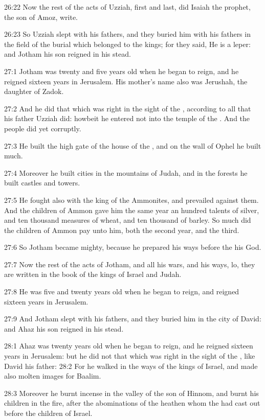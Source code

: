 26:22 Now the rest of the acts of Uzziah, first and last, did Isaiah
the prophet, the son of Amoz, write.

26:23 So Uzziah slept with his fathers, and they buried him with his
fathers in the field of the burial which belonged to the kings; for
they said, He is a leper: and Jotham his son reigned in his stead.

27:1 Jotham was twenty and five years old when he began to reign, and
he reigned sixteen years in Jerusalem. His mother's name also was
Jerushah, the daughter of Zadok.

27:2 And he did that which was right in the sight of the \LORD,
according to all that his father Uzziah did: howbeit he entered not
into the temple of the \LORD. And the people did yet corruptly.

27:3 He built the high gate of the house of the \LORD, and on the wall
of Ophel he built much.

27:4 Moreover he built cities in the mountains of Judah, and in the
forests he built castles and towers.

27:5 He fought also with the king of the Ammonites, and prevailed
against them. And the children of Ammon gave him the same year an
hundred talents of silver, and ten thousand measures of wheat, and ten
thousand of barley. So much did the children of Ammon pay unto him,
both the second year, and the third.

27:6 So Jotham became mighty, because he prepared his ways before the
\LORD his God.

27:7 Now the rest of the acts of Jotham, and all his wars, and his
ways, lo, they are written in the book of the kings of Israel and
Judah.

27:8 He was five and twenty years old when he began to reign, and
reigned sixteen years in Jerusalem.

27:9 And Jotham slept with his fathers, and they buried him in the
city of David: and Ahaz his son reigned in his stead.

28:1 Ahaz was twenty years old when he began to reign, and he reigned
sixteen years in Jerusalem: but he did not that which was right in the
sight of the \LORD, like David his father: 28:2 For he walked in the
ways of the kings of Israel, and made also molten images for Baalim.

28:3 Moreover he burnt incense in the valley of the son of Hinnom, and
burnt his children in the fire, after the abominations of the heathen
whom the \LORD had cast out before the children of Israel.

